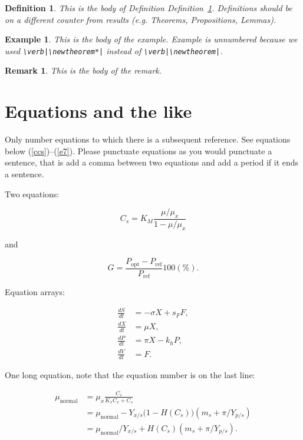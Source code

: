 \documentclass[qe,nameyear,draft]{econsocart}
\theoremstyle{plain}
\newtheorem{definition}{Definition}[section]
\newtheorem{example}{Example}[section]
\newtheorem{remark}{Remark}[section]
\begin{document}
\begin{definition}\label{de1}This is the body of Definition Definition~\ref{de1}. Definitions should be on a different counter from results (e.g. Theorems, Propositions, Lemmas).

\end{definition}\begin{example}This is the body of the example. Example is unnumbered because we used \texttt{{\textbackslash}verb|{\textbackslash}newtheorem*|}
instead of \texttt{{\textbackslash}verb|{\textbackslash}newtheorem|}.

\end{example}\begin{remark}This is the body of the remark.

\end{remark}\section{Equations and the like}

Only number equations to which there is a subsequent reference.
See equations below (\ref{ccs})--(\ref{e7}). Please punctuate equations as you would punctuate a sentence, that is add a comma between two equations and add a period if it ends a sentence.

Two equations:

\begin{equation}
\label{ccs}
C_{s}  =  K_{M} \frac{\mu/\mu_{x}}{1-\mu/\mu_{x}}
\end{equation}

and

\begin{equation}
G = \frac{P_{\mathrm{opt}} - P_{\mathrm{ref}}}{P_{\mathrm{ref}}}  100(\%).
\end{equation}

Equation arrays:

\begin{align}
  \frac{dS}{dt} & = - \sigma X + s_{F} F,\\
  \frac{dX}{dt} & =   \mu    X,\\
  \frac{dP}{dt} & =   \pi    X - k_{h} P,\\
  \frac{dV}{dt} & =   F.
\end{align}

One long equation, note that the equation number is on the last line:

\begin{align}
 \mu_{\text{normal}} & = \mu_{x} \frac{C_{s}}{K_{x}C_{x}+C_{s}}  \nonumber\\
                     & = \mu_{\text{normal}} - Y_{x/s}\bigl(1-H(C_{s})\bigr)(m_{s}+\pi /Y_{p/s})\nonumber\\
                     & = \mu_{\text{normal}}/Y_{x/s}+ H(C_{s}) (m_{s}+ \pi /Y_{p/s}).
\end{align}
\end{document}
